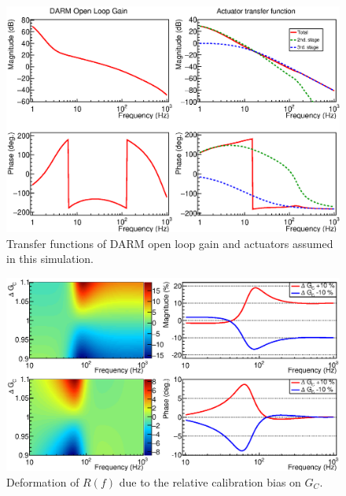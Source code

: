 \begin{figure}
\begin{center}
\includegraphics[width=\linewidth]{Figures/appa-olg.eps}
\caption{Transfer functions of DARM open loop gain and actuators assumed in 
this simulation.}
\label{fig:appa-olg} 
\end{center}
\end{figure}

\begin{figure}
\begin{center}
\includegraphics[width=\linewidth]{Figures/appa-cal1.eps}
\caption{Deformation of $R(f)$ due to the relative calibration bias on $G_C$.}
\label{fig:appa-cal1} 
\end{center}
\end{figure}

